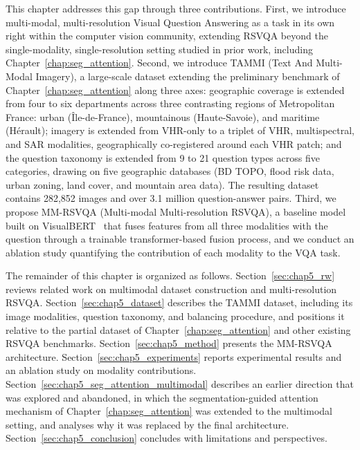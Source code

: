 This chapter addresses this gap through three contributions.
First, we introduce multi-modal, multi-resolution Visual
Question Answering as a task in its own right within the
computer vision community, extending RSVQA beyond the
single-modality, single-resolution setting studied in prior
work, including Chapter~\ref{chap:seg_attention}. Second, we
introduce TAMMI (Text And Multi-Modal Imagery), a
large-scale dataset extending the preliminary benchmark of
Chapter~\ref{chap:seg_attention} along three axes:
geographic coverage is extended from four to six
departments across three contrasting regions of
Metropolitan France: urban (Île-de-France), mountainous
(Haute-Savoie), and maritime (Hérault); imagery is extended
from VHR-only to a triplet of VHR, multispectral, and SAR
modalities, geographically co-registered around each VHR
patch; and the question taxonomy is extended from 9 to 21
question types across five categories, drawing on five
geographic databases (BD TOPO, flood risk data, urban
zoning, land cover, and mountain area data). The resulting
dataset contains 282,852 images and over 3.1 million
question-answer pairs. Third, we propose MM-RSVQA
(Multi-modal Multi-resolution RSVQA), a baseline model built
on VisualBERT~\cite{li2019visualbert} that fuses features
from all three modalities with the question through a
trainable transformer-based fusion process, and we conduct
an ablation study quantifying the contribution of each
modality to the VQA task.

The remainder of this chapter is organized as follows.
Section~\ref{sec:chap5_rw} reviews related work on
multimodal dataset construction and multi-resolution RSVQA.
Section~\ref{sec:chap5_dataset} describes the TAMMI dataset,
including its image modalities, question taxonomy, and
balancing procedure, and positions it relative to the
partial dataset of Chapter~\ref{chap:seg_attention} and other
existing RSVQA benchmarks. Section~\ref{sec:chap5_method}
presents the MM-RSVQA architecture.
Section~\ref{sec:chap5_experiments} reports experimental
results and an ablation study on modality contributions.
Section~\ref{sec:chap5_seg_attention_multimodal} describes
an earlier direction that was explored and abandoned, in
which the segmentation-guided attention mechanism of
Chapter~\ref{chap:seg_attention} was extended to the
multimodal setting, and analyses why it was replaced by
the final architecture.
Section~\ref{sec:chap5_conclusion} concludes with limitations
and perspectives.

